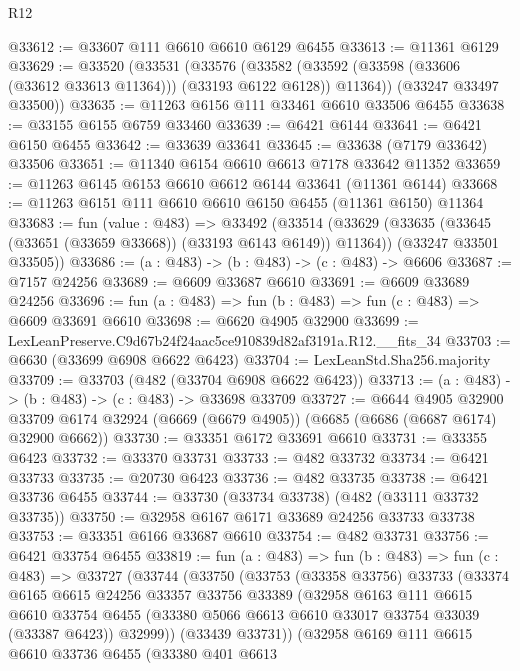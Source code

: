 \begin{lexlean}{R12}
\begin{coremodule}
@33612 := @33607 @111 @6610 @6610 @6129 @6455
@33613 := @11361 @6129
@33629 := @33520
    (@33531
      (@33576
        (@33582 (@33592 (@33598 (@33606 (@33612 @33613 @11364))) (@33193 @6122 @6128)) @11364))
      (@33247 @33497 @33500))
@33635 := @11263 @6156 @111 @33461 @6610 @33506 @6455
@33638 := @33155 @6155 @6759 @33460
@33639 := @6421 @6144
@33641 := @6421 @6150 @6455
@33642 := @33639 @33641
@33645 := @33638 (@7179 @33642) @33506
@33651 := @11340 @6154 @6610 @6613 @7178 @33642 @11352
@33659 := @11263 @6145 @6153 @6610 @6612 @6144 @33641 (@11361 @6144)
@33668 := @11263 @6151 @111 @6610 @6610 @6150 @6455 (@11361 @6150) @11364
@33683 := fun (value : @483) =>
  @33492
    (@33514
      (@33629 (@33635 (@33645 (@33651 (@33659 @33668)) (@33193 @6143 @6149)) @11364))
      (@33247 @33501 @33505))
@33686 := (a : @483) -> (b : @483) -> (c : @483) -> @6606
@33687 := @7157 @24256
@33689 := @6609 @33687 @6610
@33691 := @6609 @33689 @24256
@33696 := fun (a : @483) => fun (b : @483) => fun (c : @483) => @6609 @33691 @6610
@33698 := @6620 @4905 @32900
@33699 := LexLeanPreserve.C9d67b24f24aac5ce910839d82af3191a.R12.__fits_34
@33703 := @6630 (@33699 @6908 @6622 @6423)
@33704 := LexLeanStd.Sha256.majority
@33709 := @33703 (@482 (@33704 @6908 @6622 @6423))
@33713 := (a : @483) -> (b : @483) -> (c : @483) -> @33698 @33709
@33727 := @6644
    @4905
    @32900
    @33709
    @6174
    @32924
    (@6669 (@6679 @4905))
    (@6685 (@6686 (@6687 @6174) @32900 @6662))
@33730 := @33351 @6172 @33691 @6610
@33731 := @33355 @6423
@33732 := @33370 @33731
@33733 := @482 @33732
@33734 := @6421 @33733
@33735 := @20730 @6423
@33736 := @482 @33735
@33738 := @6421 @33736 @6455
@33744 := @33730 (@33734 @33738) (@482 (@33111 @33732 @33735))
@33750 := @32958 @6167 @6171 @33689 @24256 @33733 @33738
@33753 := @33351 @6166 @33687 @6610
@33754 := @482 @33731
@33756 := @6421 @33754 @6455
@33819 := fun (a : @483) =>
  fun (b : @483) =>
  fun (c : @483) =>
  @33727
    (@33744
      (@33750
        (@33753
          (@33358 @33756)
          @33733
          (@33374
            @6165
            @6615
            @24256
            @33357
            @33756
            @33389
            (@32958
              @6163
              @111
              @6615
              @6610
              @33754
              @6455
              (@33380 @5066 @6613 @6610 @33017 @33754 @33039 (@33387 @6423))
              @32999))
          (@33439 @33731))
        (@32958
          @6169
          @111
          @6615
          @6610
          @33736
          @6455
          (@33380
            @401
            @6613

\end{coremodule}
\end{lexlean}
